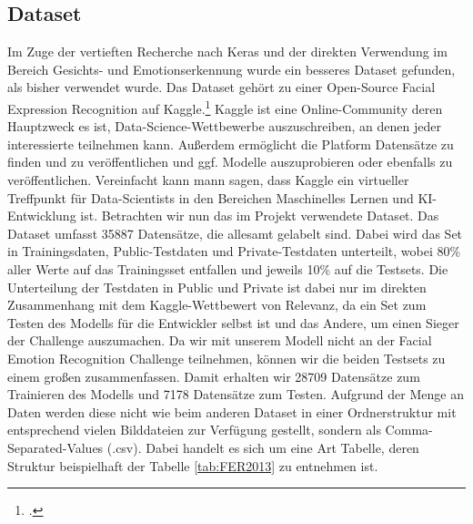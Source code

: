\documentclass[12pt, a4paper]{scrbook}
\begin{document}
\subsection{Dataset}
Im Zuge der vertieften Recherche nach Keras und der direkten Verwendung im Bereich Gesichts- und Emotionserkennung wurde ein besseres Dataset gefunden, als bisher verwendet wurde. Das Dataset gehört zu einer Open-Source Facial Expression Recognition auf Kaggle.\footcite[Vgl.][]{FER-Challenge} Kaggle ist eine Online-Community deren Hauptzweck es ist, Data-Science-Wettbewerbe auszuschreiben, an denen jeder interessierte teilnehmen kann. Außerdem ermöglicht die Platform Datensätze zu finden und zu veröffentlichen und ggf. Modelle auszuprobieren oder ebenfalls zu veröffentlichen. Vereinfacht kann mann sagen, dass Kaggle ein virtueller Treffpunkt für Data-Scientists in den Bereichen Maschinelles Lernen und KI-Entwicklung ist.\newline
Betrachten wir nun das im Projekt verwendete Dataset.
Das Dataset umfasst 35887 Datensätze, die allesamt gelabelt sind. Dabei wird das Set in Trainingsdaten, Public-Testdaten und Private-Testdaten unterteilt, wobei 80\% aller Werte auf das Trainingsset entfallen und jeweils 10\% auf die Testsets. Die Unterteilung der Testdaten in Public und Private ist dabei nur im direkten Zusammenhang mit dem Kaggle-Wettbewert von Relevanz, da ein Set zum Testen des Modells für die Entwickler selbst ist und das Andere, um einen Sieger der Challenge auszumachen. Da wir mit unserem Modell nicht an der Facial Emotion Recognition Challenge teilnehmen, können wir die beiden Testsets zu einem großen zusammenfassen. Damit erhalten wir 28709 Datensätze zum Trainieren des Modells und 7178 Datensätze zum Testen. Aufgrund der Menge an Daten werden diese nicht wie beim anderen Dataset in einer Ordnerstruktur mit entsprechend vielen Bilddateien zur Verfügung gestellt, sondern als Comma-Separated-Values (.csv). Dabei handelt es sich um eine Art Tabelle, deren Struktur beispielhaft der Tabelle \ref{tab:FER2013} zu entnehmen ist.
\end{document}
